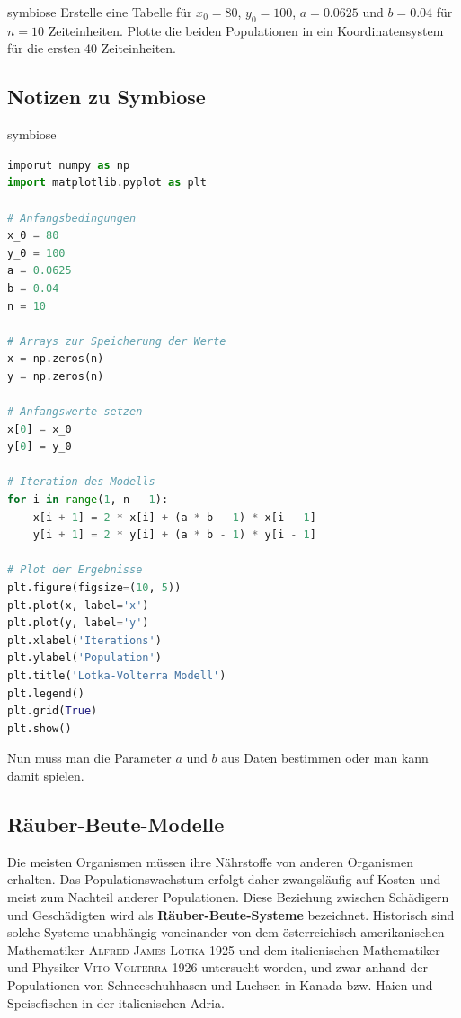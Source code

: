\documentclass[%
<<<<<<< Updated upstream
11pt,%
twoside,%
titlepage,%
german,%
headsepline%
]{scrartcl}
\begin{document}
\begin{uebenv}{symbiose}
Erstelle eine Tabelle für $x_0=80$, $y_0=100$, $a=0.0625$ und $b=0.04$ für $n=10$ Zeiteinheiten. Plotte die beiden Populationen in ein Koordinatensystem für die ersten 40 Zeiteinheiten.
\end{uebenv}

\subsection{Notizen zu Symbiose}

\begin{lsg}{symbiose}
    \begin{lstlisting}[language=python]
imporut numpy as np
import matplotlib.pyplot as plt

# Anfangsbedingungen
x_0 = 80
y_0 = 100
a = 0.0625
b = 0.04
n = 10

# Arrays zur Speicherung der Werte
x = np.zeros(n)
y = np.zeros(n)

# Anfangswerte setzen
x[0] = x_0
y[0] = y_0

# Iteration des Modells
for i in range(1, n - 1):
    x[i + 1] = 2 * x[i] + (a * b - 1) * x[i - 1]
    y[i + 1] = 2 * y[i] + (a * b - 1) * y[i - 1]

# Plot der Ergebnisse
plt.figure(figsize=(10, 5))
plt.plot(x, label='x')
plt.plot(y, label='y')
plt.xlabel('Iterations')
plt.ylabel('Population')
plt.title('Lotka-Volterra Modell')
plt.legend()
plt.grid(True)
plt.show()

    \end{lstlisting}

    Nun muss man die Parameter $a$ und $b$ aus Daten bestimmen oder man kann damit spielen.
\end{lsg}

\clearpage

\subsection{Räuber-Beute-Modelle}

Die meisten Organismen müssen ihre Nährstoffe von anderen Organismen erhalten. Das Populationswachstum erfolgt daher zwangsläufig auf Kosten und meist zum Nachteil anderer Populationen. Diese Beziehung zwischen Schädigern und Geschädigten wird als \textbf{Räuber-Beute-Systeme} bezeichnet. Historisch sind solche Systeme unabhängig voneinander von dem österreichisch-amerikanischen Mathematiker \textsc{Alfred James Lotka} 1925 und dem italienischen
Mathematiker und Physiker \textsc{Vito Volterra} 1926 untersucht worden, und zwar anhand der Populationen von Schneeschuhhasen und Luchsen in Kanada bzw. Haien und Speisefischen in der italienischen Adria.
\end{document}
